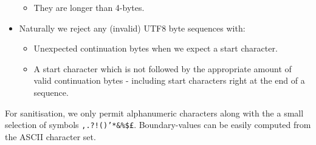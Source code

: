 \begin{itemize}
\begin{itemize}
            \item They are longer than 4-bytes.
        \end{itemize}
        \item Naturally we reject any (invalid) UTF8 byte sequences with:
        \begin{itemize}
            \item Unexpected continuation bytes when we expect a start character.
            \item A start character which is not followed by the appropriate amount of valid continuation bytes - including start characters right at the end of a sequence.
        \end{itemize}
    \end{itemize}
    
For sanitisation, we only permit alphanumeric characters along with the a small selection of symbols {\tt ,.?!()'*\&\%\$£}. Boundary-values can be easily computed from the ASCII character set.